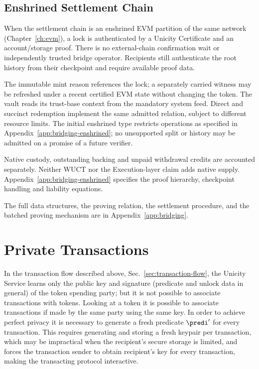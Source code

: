 \subsection{Enshrined Settlement Chain}\label{sec:bridge-enshrined}

When the settlement chain is an enshrined EVM partition of the same network (Chapter~\ref{ch:evm}), a lock is authenticated by a Unicity Certificate and an account/storage proof. There is no external-chain confirmation wait or independently trusted bridge operator. Recipients still authenticate the root history from their checkpoint and require available proof data.

The immutable mint reason references the lock; a separately carried witness may be refreshed under a recent certified EVM state without changing the token. The vault reads its trust-base context from the mandatory system feed. Direct and succinct redemption implement the same admitted relation, subject to different resource limits. The initial enshrined type restricts operations as specified in Appendix~\ref{app:bridging-enshrined}; no unsupported split or history may be admitted on a promise of a future verifier.

Native custody, outstanding backing and unpaid withdrawal credits are accounted separately. Neither WUCT nor the Execution-layer claim adds native supply. Appendix~\ref{app:bridging-enshrined} specifies the proof hierarchy, checkpoint handling and liability equations.

The full data structures, the proving relation, the settlement procedure, and the batched proving mechanism are in Appendix~\ref{app:bridging}.

\section{Private Transactions}\label{sec:private-transactions}

In the transaction flow described above, Sec.~\ref{sec:transaction-flow}, the Unicity Service learns only the public key and signature (predicate and unlock data in general) of the token spending party; but it is not possible to associate transactions with tokens. Looking at a token it is possible to associate transactions if made by the same party using the same key. In order to achieve perfect privacy it is necessary to generate a fresh predicate $\predi'$ for every transaction. This requires generating and storing a fresh keypair per transaction, which may be impractical when the recipient's secure storage is limited, and forces the transaction sender to obtain recipient's key for every transaction, making the transacting protocol interactive.

